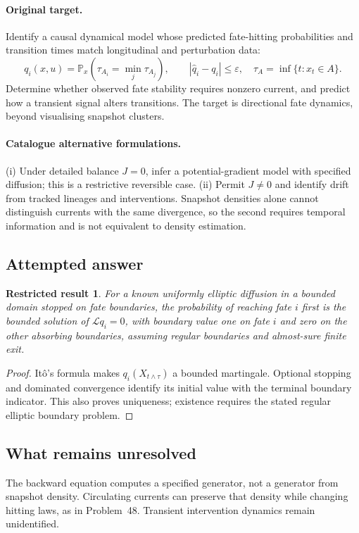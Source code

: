 \documentclass[11pt]{article}
\newcommand{\Prob}{\mathbb P}
\providecommand{\Prob}{\mathbb P}
\newtheorem{attemptresult}{Restricted result}[section]
\begin{document}
\paragraph{Original target.}
Identify a causal dynamical model whose predicted fate-hitting probabilities and transition times match longitudinal and perturbation data:
\[
q_i(x,u)=\Prob_x(\tau_{A_i}=\min_j\tau_{A_j}),
\qquad
|\widehat q_i-q_i|\leq\varepsilon,
\quad\tau_A=\inf\{t:x_t\in A\}.
\]
Determine whether observed fate stability requires nonzero current, and predict how a transient signal alters transitions. The target is directional fate dynamics, beyond visualising snapshot clusters.
\paragraph{Catalogue alternative formulations.}
(i) Under detailed balance $J=0$, infer a potential-gradient model with specified diffusion; this is a restrictive reversible case. (ii) Permit $J\neq0$ and identify drift from tracked lineages and interventions. Snapshot densities alone cannot distinguish currents with the same divergence, so the second requires temporal information and is not equivalent to density estimation.
\subsection{Attempted answer}
\begin{attemptresult}
For a known uniformly elliptic diffusion in a bounded domain stopped on fate boundaries, the probability of reaching fate $i$ first is the bounded solution of $\mathcal Lq_i=0$, with boundary value one on fate $i$ and zero on the other absorbing boundaries, assuming regular boundaries and almost-sure finite exit.
\end{attemptresult}
\begin{proof}
It\^o's formula makes $q_i(X_{t\wedge\tau})$ a bounded martingale. Optional stopping and dominated convergence identify its initial value with the terminal boundary indicator. This also proves uniqueness; existence requires the stated regular elliptic boundary problem.
\end{proof}
\subsection{What remains unresolved}
The backward equation computes a specified generator, not a generator from snapshot density. Circulating currents can preserve that density while changing hitting laws, as in Problem~48. Transient intervention dynamics remain unidentified.
\end{document}
